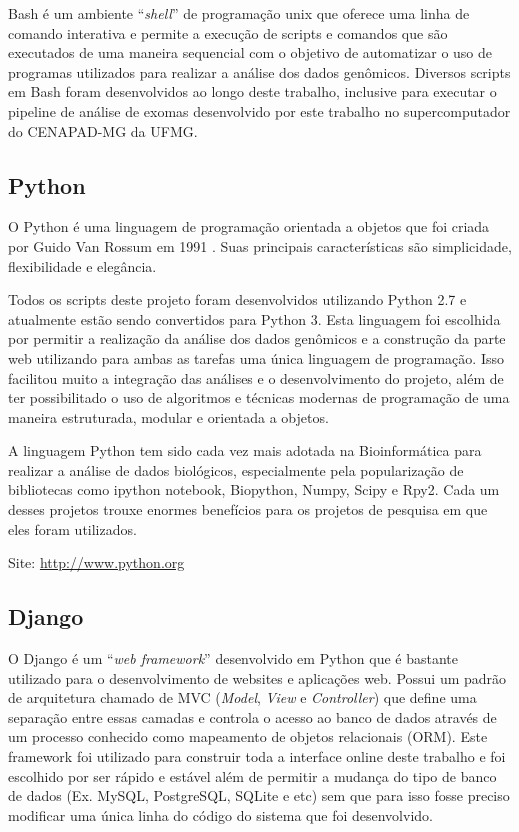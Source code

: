 Bash é um ambiente ``\textit{shell}'' de programação unix que oferece uma linha de comando interativa e permite a execução de scripts e comandos que são executados de uma maneira sequencial com o objetivo de automatizar o uso de programas utilizados para realizar a análise dos dados genômicos. Diversos scripts em Bash foram desenvolvidos ao longo deste trabalho, inclusive para executar o pipeline de análise de exomas desenvolvido por este trabalho no supercomputador do CENAPAD-MG da UFMG.

\subsection{Python}

O Python é uma linguagem de programação orientada a objetos que foi criada por Guido Van Rossum em 1991 \cite{python}. Suas principais características são simplicidade, flexibilidade e elegância.

Todos os scripts deste projeto foram desenvolvidos utilizando Python 2.7 e atualmente estão sendo convertidos para Python 3. Esta linguagem foi escolhida por permitir a realização da análise dos dados genômicos e a construção da parte web utilizando para ambas as tarefas uma única linguagem de programação. Isso facilitou muito a integração das análises e o desenvolvimento do projeto, além de ter possibilitado o uso de algoritmos e técnicas modernas de programação de uma maneira estruturada, modular e orientada a objetos.

A linguagem Python tem sido cada vez mais adotada na Bioinformática para realizar a análise de dados biológicos, especialmente pela popularização de bibliotecas como ipython notebook, Biopython, Numpy, Scipy e Rpy2. Cada um desses projetos trouxe enormes benefícios para os projetos de pesquisa em que eles foram utilizados.

\noindent
Site: \url{http://www.python.org}

\subsection{Django}

O Django é um ``\textit{web framework}'' desenvolvido em Python que é bastante utilizado para o desenvolvimento de websites e aplicações web. Possui um padrão de arquitetura chamado de MVC (\textit{Model}, \textit{View} e \textit{Controller}) que define uma separação entre essas camadas e controla o acesso ao banco de dados através de um processo conhecido como mapeamento de objetos relacionais (ORM). Este framework foi utilizado para construir toda a interface online deste trabalho e foi escolhido por ser rápido e estável além de permitir a mudança do tipo de banco de dados (Ex. MySQL, PostgreSQL, SQLite e etc) sem que para isso fosse preciso modificar uma única linha do código do sistema que foi desenvolvido. 

